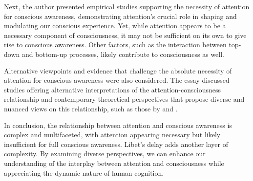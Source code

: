 \documentclass[10pt]{article}
\begin{document}
\begin{sloppypar}
  Next, the author presented empirical studies supporting the necessity of attention for conscious awareness, demonstrating attention’s crucial role in shaping and modulating our conscious experience. Yet, while attention appears to be a necessary component of consciousness, it may not be sufficient on its own to give rise to conscious awareness. Other factors, such as the interaction between top-down and bottom-up processes, likely contribute to consciousness as well.

  Alternative viewpoints and evidence that challenge the absolute necessity of attention for conscious awareness were also considered. The essay discussed studies offering alternative interpretations of the attention-consciousness relationship and contemporary theoretical perspectives that propose diverse and nuanced views on this relationship, such as those by \cite{montemayor_types_2021} and \cite{noah_recent_2020}.

  In conclusion, the relationship between attention and conscious awareness is complex and multifaceted, with attention appearing necessary but likely insufficient for full conscious awareness. Libet’s delay adds another layer of complexity. By examining diverse perspectives, we can enhance our understanding of the interplay between attention and consciousness while appreciating the dynamic nature of human cognition.


  \pagebreak
  \singlespacing %
  
  

\end{sloppypar}
\end{document}

